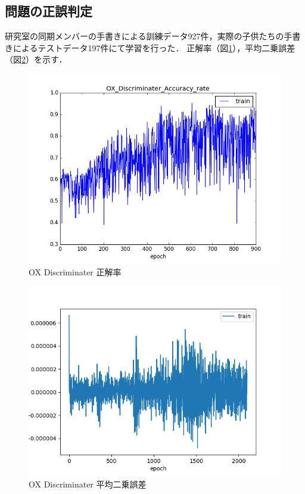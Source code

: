\documentclass[a4j,11pt,report]{jsbook}
\begin{document}
\subsection{問題の正誤判定}
研究室の同期メンバーの手書きによる訓練データ927件，実際の子供たちの手書きによるテストデータ197件にて学習を行った．
正解率（図\ref{fig:OX_Discriminater_ACC}），平均二乗誤差（図\ref{fig:OX_Discriminater_loss}）を示す．

\begin{center}
  \begin{figure}
    \centering
    \includegraphics[width=0.8\linewidth]{image/OX_Discriminater_Accuracy_rateplot.png}
    \caption{OX Discriminater 正解率}
    \label{fig:OX_Discriminater_ACC}
  \end{figure}
\end{center}


\begin{center}
  \begin{figure}
    \centering
    \includegraphics[width=0.8\linewidth]{image/LOSSplot.png}
    \caption{OX Discriminater 平均二乗誤差 }
    \label{fig:OX_Discriminater_loss}
  \end{figure}
\end{center}
\clearpage
\end{document}
